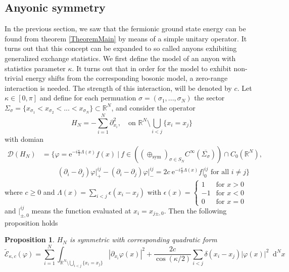 \documentclass[a4paper,11pt]{article}
\newcommand{\euler}[1]{\text{e}^{#1}}
\newcommand{\abs}[1]{\left\lvert #1 \right\rvert}
\newcommand*\diff{\mathop{}\!\mathrm{d}}
\newcommand{\R}{\mathbb{R}}
\newtheorem{proposition}[theorem]{Proposition}
\numberwithin{equation}{section}
\begin{document}
		\subsection{Anyonic symmetry}
		In the previous section, we saw that the fermionic ground state energy can be found from theorem \ref{TheoremMain} by means of a simple unitary operator. It turns out that this concept can be expanded to so called anyons exhibiting generalized exchange statistics. We first define the model of an anyon with statistics parameter $ \kappa $. It turns out that in order for the model to exhibit non-trivial energy shifts from the corresponding bosonic model, a zero-range interaction is needed. The strength of this interaction, will be denoted by $ c $.
			Let $ \kappa\in[0,\pi] $ and define for each permuation $ \sigma=(\sigma_1,...,\sigma_N) $ the sector $ \Sigma_\sigma=\{x_{\sigma_1}<x_{\sigma_2}<...<x_{\sigma_N}\}\subset \R^N $, and consider the operator\begin{equation}
			H_N=-\sum_{i=1}^{N}\partial_{x_i}^2,\quad\text{on }\R^N\setminus\bigcup_{i<j}\{x_i=x_j\}
			\end{equation}
			with domian \begin{equation}
			\begin{aligned}
			\mathcal{D}(H_N)&=\bigg\{\varphi=\euler{-i\frac{\kappa}{2}\Lambda(x)}f(x)\ \bigg\vert\ f\in \left((\oplus_{\text{sym}})_{\sigma\in S_N } C^\infty(\overline{\Sigma_{\sigma}})\right)\cap C_0(\R^N) ,\\&\qquad \ (\partial_i-\partial_j)\varphi\rvert^{ij}_+-(\partial_i-\partial_j)\varphi\rvert^{ij}_-=2c\ \euler{-i\frac{\kappa}{2}\Lambda(x)} f\rvert^{ij}_0 \text{ for all }i\neq j \bigg\}
			\end{aligned}
			\end{equation}
			where $ c\geq0 $ and $ \Lambda(x)= \sum_{i<j}\epsilon(x_i-x_j) $  with $ \epsilon(x)=\begin{cases}
			1&\text{for }x>0\\
			-1&\text{for }x<0\\
			0&\text{for }x=0
			\end{cases} $ and $ \vert^{ij}_{\pm,0} $ means the function evaluated at $ x_i=x_{j \pm,0} $. Then the following proposition holds \begin{proposition}\label{PropositionAnyonQuadraticForm}
				$ H_N $ is symmetric with corresponding quadratic form \begin{equation}
				\tilde{\mathcal{E}}_{\kappa,c}(\varphi)=\sum_{i=1}^{N}\int_{{\R^N\setminus\bigcup_{i<j}\{x_i=x_j\}}} \abs{\partial_{x_i}\varphi(x)}^2+\frac{2c}{\cos(\kappa/2)}\sum_{i<j} \delta(x_i-x_j)\abs{\varphi(x)}^2\diff^{N}x
				\end{equation}
			\end{proposition}
\end{document}
